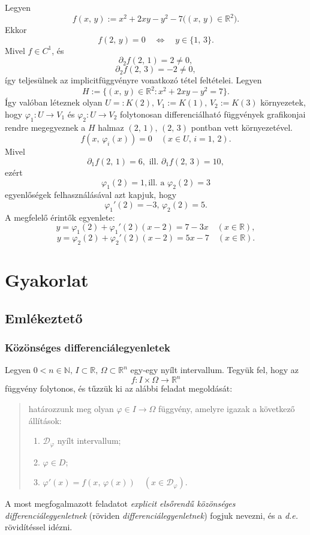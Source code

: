 \documentclass{article}
\newcommand{\R}{\mathbb{R}}
\newcommand{\N}{\mathbb{N}}
\begin{document}
	Legyen
	\[
		f(x, \, y) := x^2 + 2xy - y^2 - 7 \big( (x, \, y) \in \R^2 \big).
	\]
	Ekkor
	\[
		f(2, \, y) = 0 \quad \Longleftrightarrow \quad y \in \{1, \, 3\}.
	\]
	Mivel $f \in C^1$, és
	\[
		\partial_2 f(2, \, 1) = 2 \neq 0,
	\]
	\[
		\partial_2 f(2, \, 3) = -2 \neq 0,
	\]
	így teljesülnek az implicitfüggvényre vonatkozó tétel feltételei. Legyen
	\[
		H := \{ (x, \, y) \in \R^2 : x^2 + 2xy - y^2 = 7 \}.
	\]
	Így valóban léteznek olyan $U =: K(2), \, V_1 := K(1), \, V_2 := K(3)$ környezetek, hogy $\varphi_1 : U \to V_1$ és $\varphi_2 : U \to V_2$ folytonosan differenciálható függvények grafikonjai rendre megegyeznek a $H$ halmaz $(2, \, 1), \, (2, \, 3)$ pontban vett környezetével.
	\[
		f(x, \, \varphi_i(x)) = 0 \quad (x \in U, \, i = 1, \, 2).
	\]
	Mivel
	\[
		\partial_1 f(2, \, 1) = 6, \text{ ill. } \partial_1f(2, \, 3) = 10,
	\]
	ezért
	\[
		\varphi_1(2) = 1, \text{ill. a } \varphi_2(2) = 3
	\]
	egyenlőségek felhasználásával azt kapjuk, hogy
	\[
		\varphi_1'(2) = -3, \, \varphi_2(2) = 5.
	\]
	A megfelelő érintők egyenlete:
	\[
		y = \varphi_1(2) + \varphi_1'(2)(x-2) = 7-3x \quad (x \in \R),
	\]
	\[
		y = \varphi_2(2) + \varphi_2'(2)(x-2) = 5x-7 \quad (x \in \R).
	\]
	
	\newpage
	\section{Gyakorlat}
	\subsection{Emlékeztető}
	\subsubsection{Közönséges differenciálegyenletek}
	
	Legyen $0 < n \in \N, \, I \subset \R, \, \Omega \subset \R^n$ egy-egy nyílt intervallum. Tegyük fel, hogy az
	\[
		f : I \times \Omega \to \R^n
	\]
	függvény folytonos, és tűzzük ki az alábbi feladat megoldását:
	\begin{quote}
		határozzunk meg olyan $\varphi \in I \to \Omega$ függvény, amelyre igazak a következő állítások:
		\begin{enumerate}
			\item $\mathcal{D}_\varphi$ nyílt intervallum;
			\item $\varphi \in D$;
			\item $\varphi'(x) = f(x, \, \varphi(x)) \quad (x \in \mathcal{D}_\varphi)$.
		\end{enumerate}
	\end{quote}
	A most megfogalmazott feladatot \textit{explicit elsőrendű közönséges differenciálegyenletnek} (röviden \textit{differenciálegyenletnek}) fogjuk nevezni, és a \textit{d.e.} rövidítéssel idézni.\\
	
\end{document}
